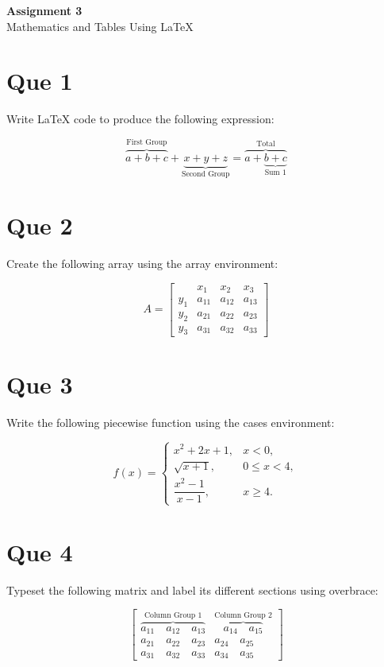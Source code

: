 \documentclass[12pt,a4paper]{article}
\begin{document}
	
	\begin{center}
		{\LARGE \textbf{Assignment 3}}\\[5pt]
		{\large Mathematics and Tables Using LaTeX}
	\end{center}
	
	\section*{Que 1}
	
	Write LaTeX code to produce the following expression:
	
	\[
	\overbrace{a+b+c}^{\text{First Group}}
	+
	\underbrace{x+y+z}_{\text{Second Group}}
	=
	\overbrace{a+\underbrace{b+c}_{\text{Sum 1}}}^{\text{Total}}
	\]
	
	\section*{Que 2}
	
	Create the following array using the array environment:
	
	\[
	A=
	\left[
	\begin{array}{c|ccc}
		& x_1 & x_2 & x_3\\
		\hline
		y_1 & a_{11} & a_{12} & a_{13}\\
		y_2 & a_{21} & a_{22} & a_{23}\\
		y_3 & a_{31} & a_{32} & a_{33}
	\end{array}
	\right]
	\]
	
	\section*{Que 3}
	
	Write the following piecewise function using the cases environment:
	
	\[
	f(x)=
	\begin{cases}
		x^2+2x+1, & x<0,\\[6pt]
		\sqrt{x+1}, & 0\leq x<4,\\[6pt]
		\dfrac{x^2-1}{x-1}, & x\geq 4.
	\end{cases}
	\]
	
	\section*{Que 4}
	
	Typeset the following matrix and label its different sections using overbrace:
	
	\[
	\begin{bmatrix}
		\overbrace{a_{11}\quad a_{12}\quad a_{13}}^{\text{Column Group 1}}
		&
		\overbrace{a_{14}\quad a_{15}}^{\text{Column Group 2}}
		\\[8pt]
		a_{21}\quad a_{22}\quad a_{23}
		&
		a_{24}\quad a_{25}
		\\[8pt]
		a_{31}\quad a_{32}\quad a_{33}
		&
		a_{34}\quad a_{35}
	\end{bmatrix}
	\]
	
\end{document}
